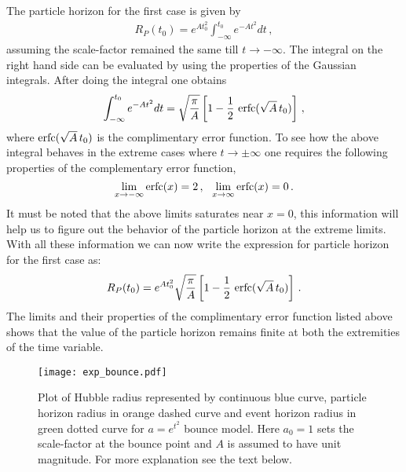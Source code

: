 \documentclass[24pt]{article}
\begin{document}
The particle horizon for the first case is given by
\begin{eqnarray}
R_P(t_0) =  e^{A t_0^2} \int_{-\infty}^{t_0} e^{-A t^2} dt\,,
\end{eqnarray}
assuming the scale-factor remained the same till $t\to -\infty$. The
integral on the right hand side can be evaluated by using the properties of the
Gaussian integrals. After doing the integral one obtains
\begin{eqnarray}
\int_{-\infty}^{t_0} e^{-A t^2} dt=\sqrt{\frac{\pi}{A}}\left[1
  -\frac{1}{2}\,\, {\rm erfc}(\sqrt{A}\, t_0)\right]\,,
\label{phint1}
\end{eqnarray}
where ${\rm erfc}(\sqrt{A}\, t_0)$ is the complimentary error
function.  To see how the above integral behaves in the extreme cases
where $t \to \pm\infty$ one requires the following properties of the
complementary error function,
$$\lim_{x \to -\infty} {\rm erfc}(x)=2\,,\,\,\,\, \lim_{x \to
  \infty} {\rm erfc}(x)=0\,.$$ It must be noted that the above
limits saturates near $x=0$, this information
will help us to figure out the behavior of the particle horizon at
the extreme limits. With all these information we can now write the
expression for particle horizon for the first case as:
\begin{eqnarray}
R_P(t_0) =  e^{A t_0^2} \sqrt{\frac{\pi}{A}}\left[1
-\frac{1}{2}\,\,
{\rm erfc}(\sqrt{A}\, t_0)\right]\,.
\label{case1}
\end{eqnarray}
The limits and their properties of the complimentary error function
listed above shows that the value of the particle horizon remains
finite at both the extremities of the time variable.
\begin{figure}[t!]
\centering
\texttt{[image: exp\_bounce.pdf]}
\caption{Plot of Hubble radius represented by continuous blue curve,
  particle horizon radius in orange dashed curve and event horizon
  radius in green dotted curve for $a=e^{t^2}$ bounce model. Here 
  $a_0=1$ sets the scale-factor at the bounce point and $A$ is assumed
  to have unit magnitude. For more explanation see the text below.}
\label{f:etsq}
\end{figure}
\end{document}
